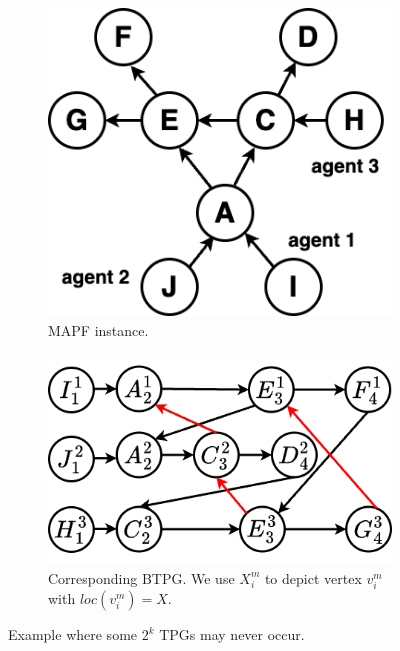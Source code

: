 \documentclass[letterpaper]{article} %
\theoremstyle{definition}
\begin{document}
\begin{figure}[t]
    \begin{subfigure}[a]{0.4\linewidth}
         \centering
         \includegraphics[width=0.87\linewidth]{Figs/examplePath.png}
         \caption{MAPF instance.}
         \label{fig: example path}
     \end{subfigure}
     \hfill
     \begin{subfigure}[a]{0.59\linewidth}
         \centering
         \includegraphics[width=.9\linewidth]{Figs/exampleBTPG.png}
         \caption{Corresponding BTPG. We use $X_i^m$ to depict vertex $v_i^m$ with $loc(v_i^m)=X$.}
         \label{fig: example BTPG}
     \end{subfigure}

     \caption{Example where some $2^k$ TPGs may never occur.}\label{fig:counter-example}
\end{figure}
\end{document}
